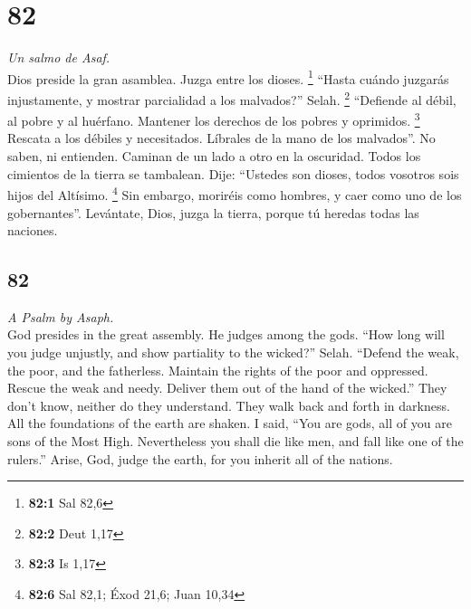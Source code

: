 \begin{paracol}{2}
\hypertarget{section-162}{%
\section{82}\label{section-162}}

\emph{Un salmo de Asaf.}\\
 Dios preside la gran asamblea. Juzga entre los dioses.
\footnote{\textbf{82:1} Sal 82,6}  ``Hasta cuándo juzgarás
injustamente, y mostrar parcialidad a los malvados?'' Selah. \footnote{\textbf{82:2}
  Deut 1,17}  ``Defiende al débil, al pobre y al huérfano.
Mantener los derechos de los pobres y oprimidos. \footnote{\textbf{82:3}
  Is 1,17}  Rescata a los débiles y necesitados. Líbrales
de la mano de los malvados''.  No saben, ni entienden.
Caminan de un lado a otro en la oscuridad. Todos los cimientos de la
tierra se tambalean.  Dije: ``Ustedes son dioses, todos
vosotros sois hijos del Altísimo. \footnote{\textbf{82:6} Sal 82,1; Éxod
  21,6; Juan 10,34}  Sin embargo, moriréis como hombres, y
caer como uno de los gobernantes''.  Levántate, Dios,
juzga la tierra, porque tú heredas todas las naciones.

\switchcolumn
\begin{otherlanguage}{english}

\hypertarget{section-163}{%
\section{82}\label{section-163}}

\emph{A Psalm by Asaph.}\\
 God presides in the great assembly. He judges among the
gods.  ``How long will you judge unjustly, and show
partiality to the wicked?'' Selah.  ``Defend the weak, the
poor, and the fatherless. Maintain the rights of the poor and oppressed.
 Rescue the weak and needy. Deliver them out of the hand
of the wicked.''  They don't know, neither do they
understand. They walk back and forth in darkness. All the foundations of
the earth are shaken.  I said, ``You are gods, all of you
are sons of the Most High.  Nevertheless you shall die
like men, and fall like one of the rulers.''  Arise, God,
judge the earth, for you inherit all of the nations.

\end{otherlanguage}


\end{paracol}
